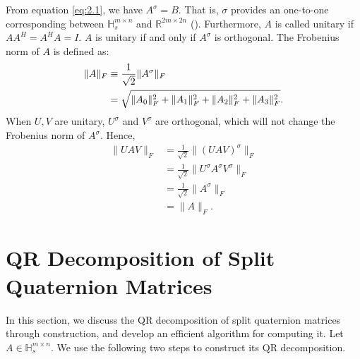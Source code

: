 \documentclass[12pt]{article}
\begin{document}
From equation \eqref{eq:2.1}, we have ${A}^\sigma = B$. 
That is, $\sigma$ provides an one-to-one corresponding between $\mathbb{H}_s^{m\times n}$ and $\mathbb{R}^{2m \times 2n}$ (\citep{Gang2024}). Furthermore, $A$ is called unitary if $AA^H = A^H A = I$. $A$ is unitary if and only if $A^\sigma$ is orthogonal.
 The Frobenius norm of $A$ is defined as: 
 \begin{align*}
     \| A \|_F &\equiv \frac{1}{\sqrt{2}} \| A^\sigma \|_F \notag \\
     &= \sqrt{\| A_0 \|_F^2 + \| A_1 \|_F^2 + \| A_2 \|_F^2 + \| A_3 \|_F^2}.
\end{align*}
When $U, V$ are unitary, $U^\sigma$ and $V^\sigma$ are orthogonal, which will not change the Frobenius norm of $A^\sigma$. Hence,
\begin{align*}
\|UAV\|_F &= \frac{1}{\sqrt{2}} \|(UAV)^\sigma\|_F \\
&= \frac{1}{\sqrt{2}} \|U^\sigma A^\sigma V^\sigma\|_F \\
&= \frac{1}{\sqrt{2}} \|A^\sigma\|_F \\
&= \|A\|_F.
\end{align*}

\section{QR Decomposition of Split Quaternion Matrices}
In this section, we discuss the QR decomposition of split quaternion matrices through construction, and develop an efficient algorithm for computing it. Let $A \in \mathbb{H}_s^{m \times n}$. We use the following two steps to construct its QR decomposition.  
\end{document}
